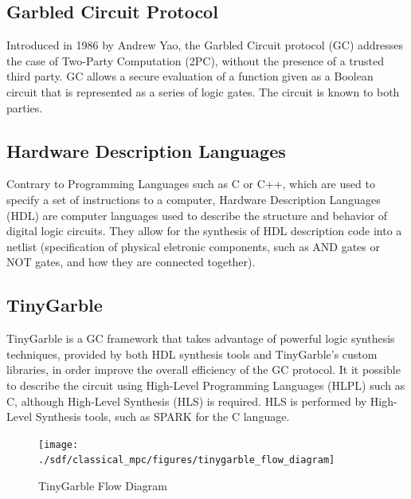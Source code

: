 \begin{refsection}


\subsection{Garbled Circuit Protocol}
Introduced in 1986 by Andrew Yao, the Garbled Circuit protocol (GC) addresses the case
of Two-Party Computation (2PC), without the presence of a trusted third party.
GC allows a secure evaluation of a function given as a Boolean circuit that is represented as a series of logic gates.
The circuit is known to both parties.\\

\subsection{Hardware Description Languages}
Contrary to Programming Languages such as C or C++, which are used to specify a set of instructions to a computer, Hardware Description Languages (HDL) are computer languages used to describe the structure and behavior of digital logic circuits. They allow for the synthesis of HDL description code into a netlist (specification of physical eletronic components, such as AND gates or NOT gates, and how they are connected together).

\subsection{TinyGarble}
TinyGarble is a GC framework that takes advantage of powerful logic synthesis techniques, provided by both HDL synthesis tools
and TinyGarble's custom libraries, in order improve the overall efficiency of the GC protocol.
It it possible to describe the circuit using High-Level Programming Languages (HLPL) such as C, although High-Level Synthesis (HLS) is required. HLS is performed by High-Level Synthesis tools, such as SPARK for the C language.

\renewcommand{\figurename}{Figure}
\begin{figure}[H]
\centering
\texttt{[image: ./sdf/classical\_mpc/figures/tinygarble\_flow\_diagram]}
\caption{TinyGarble Flow Diagram}
\label{fig:tgdiagram}
\end{figure}


\end{refsection}
